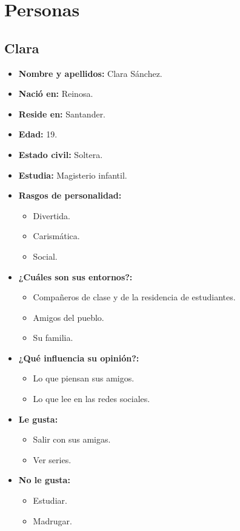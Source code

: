 \chapter{Personas}\label{chap:personas}
\section{Clara}

\begin{itemize}
  \item \textbf{Nombre y apellidos: } Clara Sánchez.
  \item \textbf{Nació en: } Reinosa.
  \item \textbf{Reside en: } Santander.
  \item \textbf{Edad: } 19.
  \item \textbf{Estado civil: } Soltera.
  \item \textbf{Estudia: } Magisterio infantil.
  \item \textbf{Rasgos de personalidad: } 
  \begin{itemize}
    \item Divertida.
    \item Carismática.
    \item Social.
  \end{itemize}
  \item \textbf{¿Cuáles son sus entornos?: } 
  \begin{itemize}
    \item Compañeros de clase y de la residencia de estudiantes.
    \item Amigos del pueblo.
    \item Su familia.
  \end{itemize}
  \item \textbf{¿Qué influencia su opinión?: } 
  \begin{itemize}
    \item Lo que piensan sus amigos.
    \item Lo que lee en las redes sociales.
  \end{itemize}
  \item \textbf{Le gusta: } 
  \begin{itemize}
    \item Salir con sus amigas.
    \item Ver series.
  \end{itemize}
  \item \textbf{No le gusta: } 
  \begin{itemize}
    \item Estudiar.
    \item Madrugar.
  \end{itemize}
\end{itemize}

